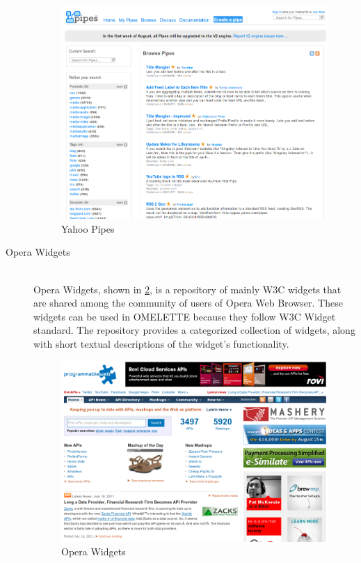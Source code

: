 \begin{description}
\begin{figure}[ht!]
\centering
\includegraphics[width=400pt]{graphics/yahoopipes.png}
\caption{Yahoo Pipes}
\label{fig:yahopipes}
\end{figure}

  \item[Opera Widgets] \hfill \\
  Opera Widgets, shown in \ref{fig:operawidgets}, is a repository of mainly W3C widgets that are shared among the community of users of Opera Web Browser. These widgets can be used in OMELETTE because they follow W3C Widget standard. The repository provides a categorized collection of widgets, along with short textual descriptions of the widget's functionality.

\begin{figure}[ht!]
\centering
\includegraphics[width=400pt]{graphics/operawidgets.png}
\caption{Opera Widgets}
\label{fig:operawidgets}
\end{figure}
\FloatBarrier
\end{description}


